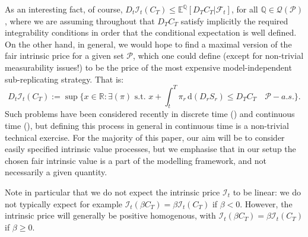 \documentclass[a4paper]{amsart}
\theoremstyle{definition}
\theoremstyle{remark}
\numberwithin{equation}{section}
\newcommand{\E}{\mathbb{E}}
\newcommand{\Q}{\mathbb{Q}}
\newcommand{\di}{\mathrm{d}}
\newcommand{\R}{\mathbb{R}}
\newcommand{\as}{a.s.}
\newcommand{\Fc}{\mathcal{F}}
\newcommand{\Eq}[1]{\E^{\Q}\left[#1\right]}
\newcommand{\Pc}{\mathcal{P}}
\newcommand{\Qc}{\mathcal{Q}}
\newcommand{\In}{\mathcal{I}} %
\begin{document}
As an interesting fact, of course, $D_t\In_t(C_T) \le \Eq{D_T C_T|\Fc_t}$, for all $\Q \in \Qc(\Pc)$, where we are assuming  throughout that $D_T C_T$ satisfy implicitly the required integrability conditions in order that the conditional expectation is well defined. On the other hand, in general, we would hope to find a maximal version of the fair intrinsic price for a given set $\mathcal{P}$, which one could define (except for non-trivial measurability issues!) to be the price of the most expensive model-independent sub-replicating strategy. That is:
\begin{equation}\label{eq:6}
 D_t \In_t(C_T) := \sup \{ x \in \R: \exists (\pi) \text{ s.t. } x + \int_t^T \pi_r \, \di (D_r S_r ) \le D_T C_T \quad \Pc-\as{}\}.
\end{equation}
Such problems have been considered recently in discrete time (\cite{beiglbock_model-independent_2013,bouchard_consistent_2016,aksamit_robust_2020}) and continuous time (\cite{Dolinsky:2014aa, beiglbock_pathwise_2017, biagini_robust_2017, hou_robust_2018, dolinsky_martingale_2015,cheridito_martingale_2021}), but defining this process in general in continuous time is a non-trivial technical exercise. For the majority of this paper, our aim will be to consider easily specified intrinsic value processes, but we emphasise that in our setup the chosen fair intrinsic value is a part of the modelling framework, and not necessarily a given quantity.

Note in particular that we do not expect the intrinsic price $\In_t$ to be linear: we do not typically expect for example $\In_t(\beta C_T) = \beta \In_t(C_T)$ if $\beta<0$. However, the intrinsic price will generally be positive homogenous, with $\In_t(\beta C_T) = \beta \In_t(C_T)$ if $\beta \ge 0$.
\end{document}
